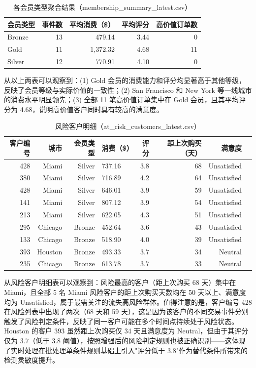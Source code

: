 \documentclass[12pt,hyperref,a4paper,UTF8]{ctexart}
\begin{document}
\begin{table}[H]
\centering
\caption{各会员类型聚合结果（membership\_summary\_latest.csv）}
\begin{tabular}{lrrrr}
\toprule
会员类型 & 事件数 & 平均消费（\$） & 平均评分 & 高价值订单数 \\
\midrule
Bronze & 13 & 479.14 & 3.44 & 0 \\
Gold & 11 & 1,372.32 & 4.68 & 11 \\
Silver & 12 & 770.91 & 4.10 & 0 \\
\bottomrule
\end{tabular}
\end{table}

从以上两表可以观察到：(1) Gold 会员的消费能力和评分均显著高于其他等级，反映了会员等级与实际价值的一致性；(2) San Francisco 和 New York 等一线城市的消费水平明显领先；(3) 全部 11 笔高价值订单集中在 Gold 会员，且其平均评分为 4.68，说明高价值客户同时具有较高的满意度。

\begin{table}[H]
\centering
\caption{风险客户明细（at\_risk\_customers\_latest.csv）}
\begin{tabular}{rrrlrrrl}
\toprule
客户编号 & 城市 & 会员类型 & 消费（\$） & 评分 & 距上次购买（天） & 满意度 \\
\midrule
428 & Miami & Silver & 737.16 & 3.8 & 68 & Unsatisfied \\
380 & Miami & Silver & 716.89 & 4.2 & 64 & Unsatisfied \\
428 & Miami & Silver & 646.01 & 3.9 & 59 & Unsatisfied \\
141 & Miami & Silver & 807.12 & 3.9 & 54 & Unsatisfied \\
213 & Miami & Silver & 622.05 & 4.3 & 51 & Unsatisfied \\
295 & Chicago & Bronze & 452.64 & 3.6 & 43 & Unsatisfied \\
133 & Chicago & Bronze & 518.90 & 4.0 & 39 & Unsatisfied \\
393 & Houston & Bronze & 493.33 & 3.7 & 34 & Neutral \\
235 & Chicago & Bronze & 613.78 & 3.7 & 33 & Neutral \\
\bottomrule
\end{tabular}
\end{table}

从风险客户明细表可以观察到：风险最高的客户（距上次购买 68 天）集中在 Miami，且全部 5 名 Miami 风险客户的距上次购买天数均在 50 天以上、满意度均为 Unsatisfied，属于最需关注的流失高风险群体。值得注意的是，客户编号 428 在风险列表中出现了两次（68 天和 59 天），这是因为该客户的不同交易事件分别触发了风险判定条件，反映了同一客户可能在多个时间点持续处于风险状态。Houston 的客户 393 虽然距上次购买仅 34 天且满意度为 Neutral，但由于其评分仅为 3.7（低于 3.8 阈值），按照增强后的风险判定规则也被正确识别——这体现了实时处理在批处理单条件规则基础上引入"评分低于 3.8"作为替代条件所带来的检测灵敏度提升。
\end{document}
